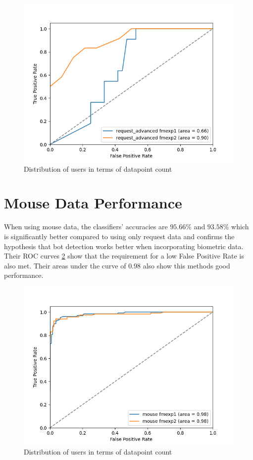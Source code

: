 \documentclass[
    fontsize=12pt,
    headings=small,
    parskip=half,           %
    bibliography=totoc,
    numbers=noenddot,       %
    open=any,               %
    final                   %
]{scrreprt}
\begin{document}
\begin{figure}[h]
	\includegraphics[width=\textwidth]{figures/roc_request_both_instances.png}
	\caption{Distribution of users in terms of datapoint count}
	\label{fig:roc_request_both_instances}
\end{figure}


\section{Mouse Data Performance}

When using mouse data, the classifiers' accuracies are $95.66\%$ and $93.58\%$ which is significantly better compared to using only request data and confirms the hypothesis that bot detection works better when incorporating biometric data. Their ROC curves \ref{fig:roc_mouse_both_instances} show that the requirement for a low False Positive Rate is also met. Their areas under the curve of $0.98$ also show this methods good performance.

\begin{figure}[h]
	\includegraphics[width=\textwidth]{figures/roc_mouse_both_instances.png}
	\caption{Distribution of users in terms of datapoint count}
	\label{fig:roc_mouse_both_instances}
\end{figure}
\end{document}
